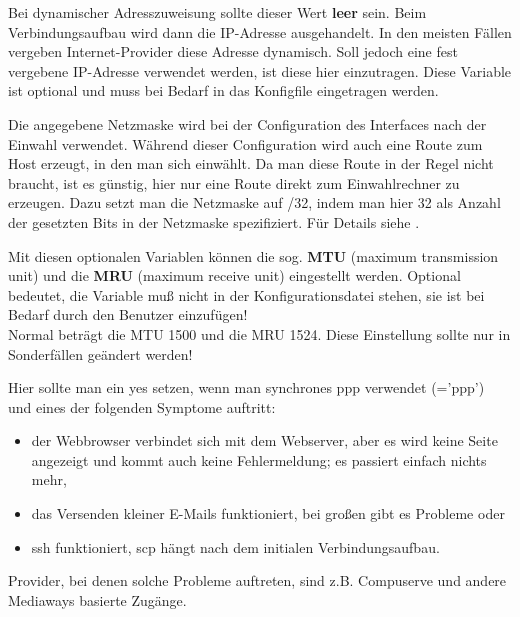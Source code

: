 \begin{description}
  Bei dynamischer Adress\-zu\-wei\-sung sollte
  dieser Wert \textbf{leer} sein. Beim Verbindungsaufbau wird dann die
  IP-Adresse ausgehandelt. In den meisten Fällen vergeben Internet-Provider
  diese Adresse
  dynamisch. Soll jedoch eine fest vergebene IP-Adresse verwendet
  werden, ist diese hier einzutragen. Diese Variable ist optional
  und muss bei Bedarf in das Konfigfile eingetragen werden.

  Die angegebene Netzmaske wird bei der Configuration des Interfaces nach
  der Einwahl verwendet. Während dieser Configuration wird auch
  eine Route zum Host erzeugt, in den man sich einwählt. Da man
  diese Route in der Regel nicht braucht, ist es günstig, hier nur
  eine Route direkt zum Einwahlrechner zu erzeugen. Dazu setzt man
  die Netzmaske auf /32, indem man hier 32 als Anzahl
  der gesetzten Bits in der Netzmaske spezifiziert. Für Details siehe
  .


  
  Mit diesen optionalen Variablen können die sog. \textbf{MTU} (maximum
  transmission unit) und die \textbf{MRU} (maximum receive unit) eingestellt
  werden. Optional bedeutet, die Variable muß nicht in der Konfigurationsdatei
  stehen, sie ist bei Bedarf durch den Benutzer einzufügen! \\ 
  Normal beträgt die MTU 1500 und die MRU 1524. Diese Einstellung sollte
  nur in Sonderfällen geändert werden!


Hier sollte man ein yes setzen, wenn man synchrones ppp verwendet
(='ppp') und eines der folgenden Symptome
auftritt:
\begin{itemize}
\item der Webbrowser verbindet sich mit dem Webserver, aber es wird
  keine Seite angezeigt und kommt auch keine Fehlermeldung; es
  passiert einfach nichts mehr,
\item das Versenden kleiner \mbox{E-Mails} funktioniert, bei großen gibt es
  Probleme oder
\item ssh funktioniert, scp hängt nach dem initialen
  Verbindungsaufbau.
\end{itemize}

Provider, bei denen solche Probleme auftreten, sind z.B. Compuserve
und andere Mediaways basierte Zugänge.


\end{description}
